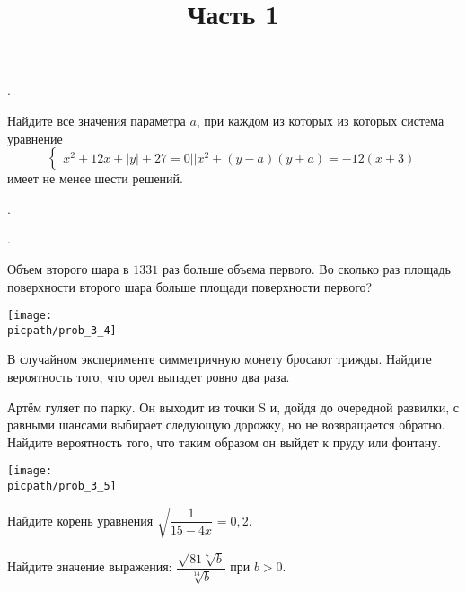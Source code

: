 \begin{training}[1]
\begin{listofex}[resume]
		\item .
		\item Найдите все значения параметра \( a \), при каждом из которых из которых система уравнение
		\[\begin{cases} x^2+12x+|y|+27=0 || x^2+(y-a)(y+a)=-12(x+3) \end{cases}\]
		имеет не менее шести решений.
		\item .
	\end{listofex}
\end{training}

\begin{training}[2]
	\title{Часть 1}
	\egepreambone
	\begin{listofex}
		\item
		.
		\foranswer
		\item
		\begin{minipage}[t]{\bodywidth}
			Объем второго шара в \( 1331 \) раз больше объема первого. Во сколько раз площадь поверхности второго шара больше площади поверхности первого?
			\foranswer
		\end{minipage}
		\gapwidth
		\begin{minipage}[t]{\picwidth}
			\texttt{[image: \\picpath/prob\_3\_4]}
		\end{minipage}
		\item В случайном эксперименте симметричную монету бросают трижды. Найдите вероятность того, что орел выпадет ровно два раза.
		\foranswer
		\item 
		\begin{minipage}[t]{\bodywidth} 
			Артём гуляет по парку. Он выходит из точки S и, дойдя до очередной развилки, с равными шансами выбирает следующую дорожку, но не возвращается обратно. Найдите вероятность того, что таким образом он выйдет к пруду или фонтану.
			\foranswer
		\end{minipage}
		\gapwidth
		\begin{minipage}[t]{\picwidth}
			\texttt{[image: \\picpath/prob\_3\_5]}
		\end{minipage}
		\item Найдите корень уравнения \( \sqrt{\dfrac{1}{15-4x}}=0,2 \). 
		\foranswer
		\newpage
		\hphantom{Часть 1}
		\item Найдите значение выражения: \( \dfrac{\sqrt{81\sqrt[7]{b}}}{\sqrt[14]{b}} \) при \( b>0 \).
		\foranswer
		\item

\end{listofex}
\end{training}

